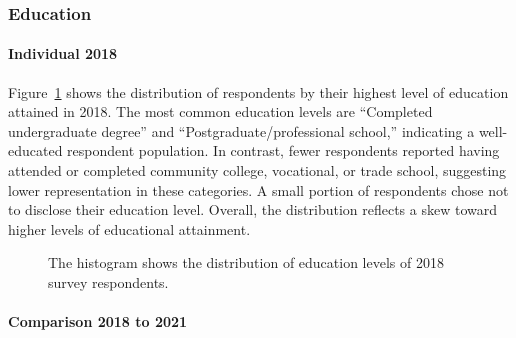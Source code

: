 \documentclass[
  letterpaper,
  DIV=11,
  numbers=noendperiod]{scrartcl}
\let\oldparagraph\paragraph
\renewcommand{\paragraph}[1]{\oldparagraph{#1}\mbox{}}
\begin{document}
\subsubsection{Education}\label{education}

\paragraph{Individual 2018}\label{individual-2018-1}

Figure~\ref{fig-three} shows the distribution of respondents by their
highest level of education attained in 2018. The most common education
levels are ``Completed undergraduate degree'' and
``Postgraduate/professional school,'' indicating a well-educated
respondent population. In contrast, fewer respondents reported having
attended or completed community college, vocational, or trade school,
suggesting lower representation in these categories. A small portion of
respondents chose not to disclose their education level. Overall, the
distribution reflects a skew toward higher levels of educational
attainment.

\begin{figure}


\caption{\label{fig-three}The histogram shows the distribution of
education levels of 2018 survey respondents.}

\end{figure}%

\paragraph{Comparison 2018 to 2021}\label{comparison-2018-to-2021-1}
\end{document}
